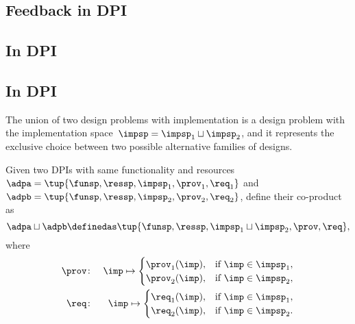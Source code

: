 \subsection{Feedback in DPI}


\subsection{In DPI}\label{subsec:dpi-intersection}

\subsection{In DPI}\label{subsec:dpi-union}


The union of two design problems with implementation is a design problem with the implementation space~$\impsp=\impsp_{1}\sqcup\impsp_{2}$, and it represents the exclusive choice between two possible alternative families of designs.

\begin{definition}
    \label{def:parallel-1}
    Given two DPIs with same functionality and resources~$\adpa=\tup{\funsp,\ressp,\impsp_{1},\prov_{1},\req_{1}}$ and~$\adpb=\tup{\funsp,\ressp,\impsp_{2},\prov_{2},\req_{2}}$, define their co-product as
    \begin{equation}
        \adpa\sqcup\adpb\definedas\tup{\funsp,\ressp,\impsp_{1}\sqcup\impsp_{2},\prov,\req} ,
    \end{equation}
    where
    \begin{eqnarray}
        \prov & \colon & \imp\mapsto\begin{cases}
                                        \prov_{1}(\imp), & \text{if }\imp\in\impsp_{1}, \\
                                        \prov_{2}(\imp), & \text{if }\imp\in\impsp_{2}, 
                                    \end{cases}\label{eq:dppar-exec-1} \\
        \req  & \colon & \imp\mapsto\begin{cases}
                                        \req_{1}(\imp), & \text{if }\imp\in\impsp_{1}, \\
                                        \req_{2}(\imp), & \text{if }\imp\in\impsp_{2}. 
                                    \end{cases}\nonumber  
    \end{eqnarray}
\end{definition}

